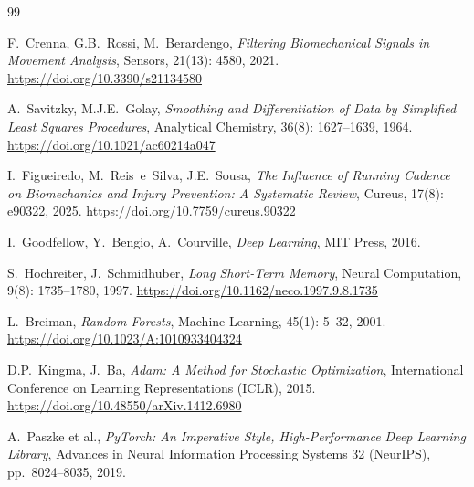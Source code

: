 \begin{thebibliography}{99}

F.\ Crenna, G.B.\ Rossi, M.\ Berardengo,
\textit{Filtering Biomechanical Signals in Movement Analysis},
Sensors, 21(13): 4580, 2021.
\url{https://doi.org/10.3390/s21134580}

A.\ Savitzky, M.J.E.\ Golay,
\textit{Smoothing and Differentiation of Data by Simplified Least Squares Procedures},
Analytical Chemistry, 36(8): 1627--1639, 1964.
\url{https://doi.org/10.1021/ac60214a047}


I.\ Figueiredo, M.\ Reis~e~Silva, J.E.\ Sousa,
\textit{The Influence of Running Cadence on Biomechanics and Injury Prevention: A Systematic Review},
Cureus, 17(8): e90322, 2025.
\url{https://doi.org/10.7759/cureus.90322}


I.\ Goodfellow, Y.\ Bengio, A.\ Courville,
\textit{Deep Learning},
MIT Press, 2016.

S.\ Hochreiter, J.\ Schmidhuber,
\textit{Long Short-Term Memory},
Neural Computation, 9(8): 1735--1780, 1997.
\url{https://doi.org/10.1162/neco.1997.9.8.1735}

L.\ Breiman,
\textit{Random Forests},
Machine Learning, 45(1): 5--32, 2001.
\url{https://doi.org/10.1023/A:1010933404324}

D.P.\ Kingma, J.\ Ba,
\textit{Adam: A Method for Stochastic Optimization},
International Conference on Learning Representations (ICLR), 2015.
\url{https://doi.org/10.48550/arXiv.1412.6980}


A.\ Paszke et al.,
\textit{PyTorch: An Imperative Style, High-Performance Deep Learning Library},
Advances in Neural Information Processing Systems 32 (NeurIPS), pp.\ 8024--8035, 2019.


\end{thebibliography}

